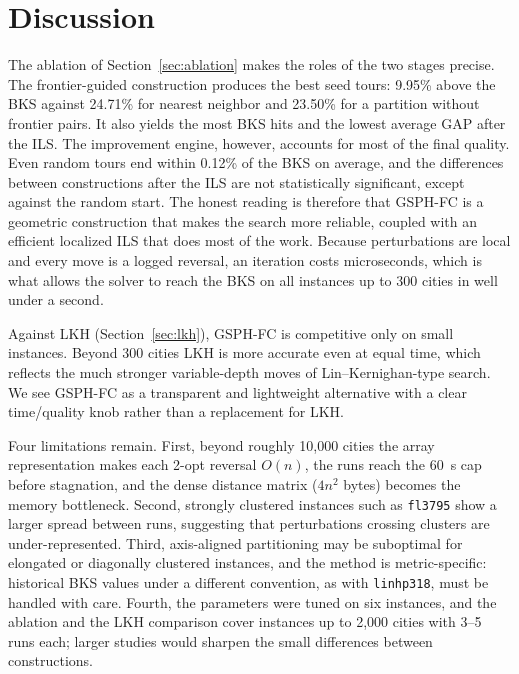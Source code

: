 \documentclass[runningheads]{llncs}
\begin{document}
\section{Discussion}
\label{sec:analysis}

The ablation of Section~\ref{sec:ablation} makes the roles of the two
stages precise. The frontier-guided construction produces the best seed
tours: 9.95\% above the BKS against 24.71\% for nearest neighbor and
23.50\% for a partition without frontier pairs. It also yields the most
BKS hits and the lowest average GAP after the ILS. The improvement
engine, however, accounts for most of the final quality. Even random
tours end within 0.12\% of the BKS on average, and the differences
between constructions after the ILS are not statistically significant,
except against the random start. The honest reading is therefore that
GSPH-FC is a geometric construction that makes the search more reliable,
coupled with an efficient localized ILS that does most of the work.
Because perturbations are local and every move is a logged reversal, an
iteration costs microseconds, which is what allows the solver to reach
the BKS on all instances up to 300 cities in well under a second.

Against LKH (Section~\ref{sec:lkh}), GSPH-FC is competitive only on
small instances. Beyond 300 cities LKH is more accurate even at equal
time, which reflects the much stronger variable-depth moves of
Lin--Kernighan-type search. We see GSPH-FC as a transparent and
lightweight alternative with a clear time/quality knob rather than a
replacement for LKH.

Four limitations remain. First, beyond roughly 10{,}000 cities the
array representation makes each 2-opt reversal $O(n)$, the runs reach
the 60~s cap before stagnation, and the dense distance matrix
($4n^2$ bytes) becomes the memory bottleneck. Second, strongly
clustered instances such as \texttt{fl3795} show a larger spread
between runs, suggesting that perturbations crossing clusters are
under-represented. Third, axis-aligned partitioning may be suboptimal
for elongated or diagonally clustered instances, and the method is
metric-specific: historical BKS values under a different convention,
as with \texttt{linhp318}, must be handled with care. Fourth, the
parameters were tuned on six instances, and the ablation and the LKH
comparison cover instances up to 2{,}000 cities with 3--5 runs each;
larger studies would sharpen the small differences between
constructions.
\end{document}
